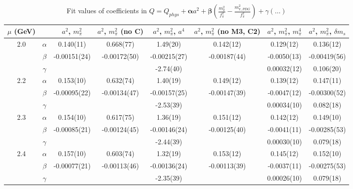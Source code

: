 \documentclass[12pt]{extarticle}
\begin{document}
\begin{table}[h!]
\begin{center}
\begin{tabular}{|c c|c|c|c|c|c|c|}
\hline
$\mu$ (GeV) &  & $a^2$, $m_\pi^2$& $a^2$, $m_\pi^2$ (no C)& $a^2$, $m_\pi^2$, $a^4$& $a^2$, $m_\pi^2$ (no M3, C2)& $a^2$, $m_\pi^2$, $m_\pi^4$& $a^2$, $m_\pi^2$, $\delta m_s$\\
\hline
\multirow{3}{0.5in}{2.0} & $\alpha$ & 0.140(11)& 0.668(77)& 1.49(20)& 0.142(12)& 0.129(12)& 0.136(12)\\
 & $\beta$ & -0.00151(24)& -0.00172(50)& -0.00215(27)& -0.00187(44)& -0.0050(13)& -0.00419(56)\\
 & $\gamma$ &  &  & -2.74(40)&  & 0.00032(12)& 0.106(20)\\
\hline
\multirow{3}{0.5in}{2.2} & $\alpha$ & 0.153(10)& 0.632(74)& 1.40(19)& 0.149(12)& 0.139(12)& 0.147(11)\\
 & $\beta$ & -0.00095(22)& -0.00134(47)& -0.00157(25)& -0.00147(39)& -0.0047(12)& -0.00300(52)\\
 & $\gamma$ &  &  & -2.53(39)&  & 0.00034(10)& 0.082(18)\\
\hline
\multirow{3}{0.5in}{2.3} & $\alpha$ & 0.154(10)& 0.617(75)& 1.36(19)& 0.151(12)& 0.142(12)& 0.149(10)\\
 & $\beta$ & -0.00085(21)& -0.00124(45)& -0.00146(24)& -0.00125(40)& -0.0041(11)& -0.00285(53)\\
 & $\gamma$ &  &  & -2.44(39)&  & 0.00030(10)& 0.079(18)\\
\hline
\multirow{3}{0.5in}{2.4} & $\alpha$ & 0.157(10)& 0.603(74)& 1.32(19)& 0.153(12)& 0.145(12)& 0.152(10)\\
 & $\beta$ & -0.00077(21)& -0.00113(46)& -0.00136(24)& -0.00113(39)& -0.0037(11)& -0.00275(53)\\
 & $\gamma$ &  &  & -2.35(39)&  & 0.00026(10)& 0.079(18)\\
\hline
\end{tabular}
\caption{Fit values of coefficients in $Q = Q_{phys} + \mathbf{\alpha} a^2 + \mathbf{\beta}\left(\frac{m_\pi^2}{f_\pi^2}-\frac{m_{\pi,PDG}^2}{f_\pi^2}\right) + \gamma(\ldots)$}
\end{center}
\end{table}






\end{document}

